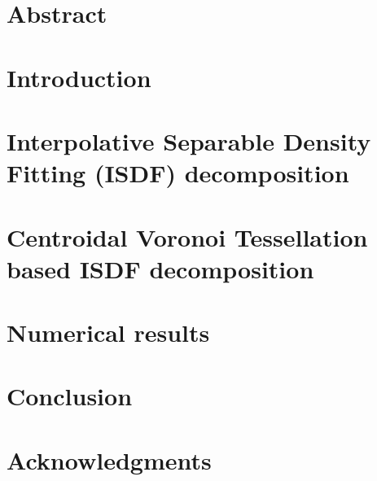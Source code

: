 \section{Abstract}\label{cvtsec:abs}
	

\section{Introduction}\label{cvtsec:int}
	

\section{Interpolative Separable Density Fitting (ISDF) decomposition}
	\label{cvtsec:bac}
	

\section{Centroidal Voronoi Tessellation based ISDF decomposition}
	\label{cvtsec:met}
	

\section{Numerical results}\label{cvtsec:num}
	

\section{Conclusion}\label{cvtsec:con}
	

\section{Acknowledgments}\label{cvtsec:ack}
	